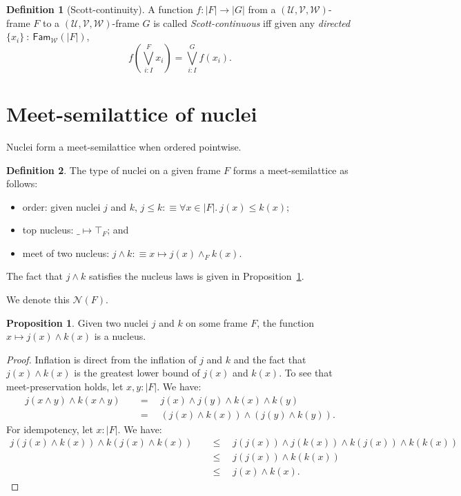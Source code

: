 \documentclass[a4paper, 11pt]{article}
\theoremstyle{definition}
\newtheorem{prop}{Proposition}
\newtheorem{defn}{Definition}
\newcommand{\UU}{\mathcal{U}}
\newcommand{\VV}{\mathcal{V}}
\newcommand{\WW}{\mathcal{W}}
\begin{document}
\begin{defn}[Scott-continuity]
  A function $f : | F | \rightarrow | G | $ from a $(\UU, \VV, \WW)$-frame $F$ to a $(\UU, \VV, \WW)$-frame
  $G$ is called \emph{Scott-continuous} iff given any \emph{directed}
  $\{ x_i \}~:~\mathsf{Fam}_{\WW}(| F |)$,
  \begin{equation*}
    f\left(\bigvee^F_{i : I} x_i\right) = \bigvee^G_{i : I} f(x_i).
  \end{equation*}
\end{defn}

\section{Meet-semilattice of nuclei}

Nuclei form a meet-semilattice when ordered pointwise.

\begin{defn}\label{defn:nuclei-semilattice}
  The type of nuclei on a given frame $F$ forms a meet-semilattice as follows:
  \begin{itemize}
    \item order: given nuclei $j$ and $k$, $j \le k :\equiv \forall x \in | F |.\ j(x) \le k(x)$;
    \item top nucleus: $\_ \mapsto \top_F$; and
    \item meet of two nucleus: $j \wedge k :\equiv x \mapsto j(x) \wedge_F k(x)$.
  \end{itemize}
  The fact that $j \wedge k$ satisfies the nucleus laws is given in Proposition~\ref{prop:nuclei-meet}.
\end{defn}

We denote this $\mathcal{N}(F)$.

\begin{prop}\label{prop:nuclei-meet}
  Given two nuclei $j$ and $k$ on some frame $F$, the function $x \mapsto j(x) \wedge k(x)$ is a nucleus.
\end{prop}
\begin{proof}
  Inflation is direct from the inflation of $j$ and $k$ and the fact that $j(x) \wedge k(x)$ is the
  greatest lower bound of $j(x)$ and $k(x)$. To see that meet-preservation holds, let
  $x, y : | F |$. We have:
  \begin{align*}
    j (x \wedge y) \wedge k (x \wedge y) &\quad=\quad j(x) \wedge j(y) \wedge k(x) \wedge k(y) \\
                          &\quad=\quad (j(x) \wedge k(x)) \wedge (j(y) \wedge k(y)).
  \end{align*}
  For idempotency, let $x : | F |$. We have:
  \begin{align*}
    j (j(x) \wedge k(x)) \wedge k(j(x) \wedge k(x)) &\quad\le\quad j(j(x)) \wedge j(k(x)) \wedge k(j(x)) \wedge k(k(x)) \\
                                     &\quad\le\quad j(j(x)) \wedge k(k(x)) & \\
                                     &\quad\le\quad j(x) \wedge k(x).
  \end{align*}
\end{proof}
\end{document}
